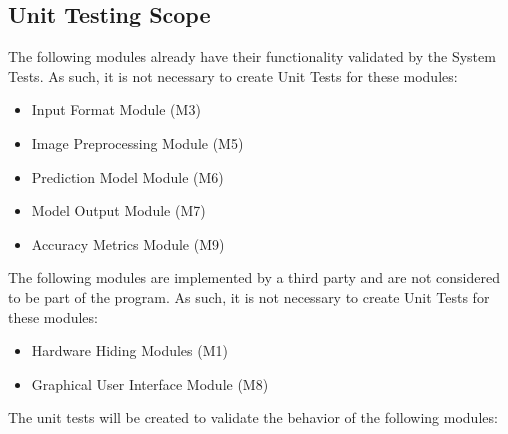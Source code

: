 \documentclass[12pt, titlepage]{article}
\begin{document}



\subsection{Unit Testing Scope}

The following modules already have their functionality validated by the System
Tests. As such, it is not necessary to create Unit Tests for these modules:

\begin{itemize}
  \item Input Format Module (M3)
  \item Image Preprocessing Module (M5)
  \item Prediction Model Module (M6)
  \item Model Output Module (M7)
  \item Accuracy Metrics Module (M9)
\end{itemize}

The following modules are implemented by a third party and are not
considered to be part of the \progname{} program. As such, it is not necessary
to create Unit Tests for these modules:

\begin{itemize}
  \item Hardware Hiding Modules (M1)
  \item Graphical User Interface Module (M8)
\end{itemize}

The unit tests will be created to validate the behavior of the following modules:
\end{document}
